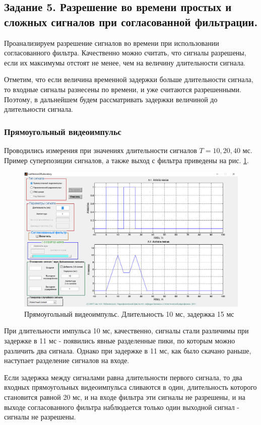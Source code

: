 \subsection{Задание 5. Разрешение во времени простых и сложных сигналов при
согласованной фильтрации.}

Проанализируем разрешение сигналов во времени при использовании согласованного фильтра.
Качественно можно считать, что сигналы разрешены, если их максимумы
отстоят не менее, чем на величину длительности сигнала.

Отметим, что если величина временной задержки больше длительности сигнала, то входные сигналы разнесены по времени, 
и уже считаются разрешенными. Поэтому, в дальнейшем будем рассматривать задержки величиной
до длительности сигнала.

\subsubsection{Прямоугольный видеоимпульс}
Проводились измерения при значениях длительности сигналов $T = 10, 20, 40$ мс. Пример суперпозиции сигналов, а также
выход с фильтра приведены на рис. \ref{fig:task5_1_10_15}.
\begin{figure}[H]
    \centering
    \includegraphics[width=0.7\linewidth]{imgs/task5/t5s1_dur10_del15.png}
    \caption{Прямоугольный видеоимпульс. Длительность 10 мс, задержка 15 мс}
    \label{fig:task5_1_10_15}
\end{figure}
При длительности импульса 10 мс, качественно, сигналы стали различимы при задержке в 11 мс - появились явные разделенные
пики, по которым можно различить два сигнала. Однако при задержке в 11 мс, как было скачано раньше, наступает разделение
сигналов на входе. 

Если задержка между сигналами равна длительности первого сигнала, то два входных прямоугольных видеоимпульса
сливаются в один, длительность которого становится равной 20 мс, и на входе фильтра эти сигналы не разрешены, и на
выходе согласованного фильтра наблюдается только один выходной сигнал - сигналы не разрешены.

